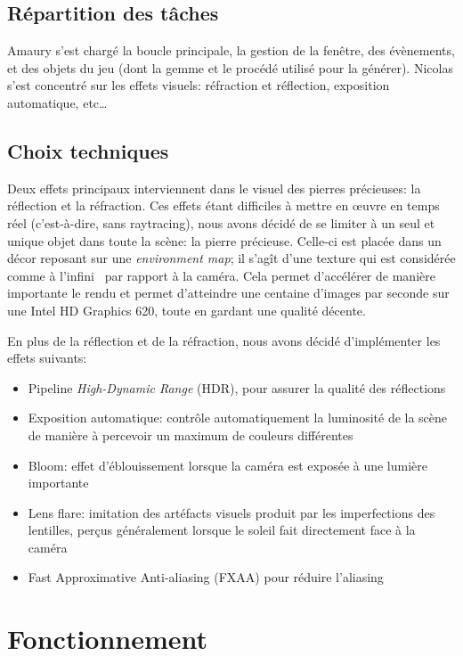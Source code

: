 \documentclass[a4paper,12pt]{article}
\begin{document}
\subsection{Répartition des tâches}
Amaury s'est chargé la boucle principale, la gestion de la fenêtre, des évènements, et des objets du jeu
(dont la gemme et le procédé utilisé pour la générer). Nicolas s'est concentré sur les effets visuels: réfraction et réflection,
exposition automatique, etc\ldots

\subsection{Choix techniques}
Deux effets principaux interviennent dans le visuel des pierres précieuses: la réflection et la réfraction.
Ces effets étant difficiles à mettre en œuvre en temps réel (c'est-à-dire, sans raytracing), nous avons décidé
de se limiter à un seul et unique objet dans toute la scène: la pierre précieuse. Celle-ci est placée dans un
décor reposant sur une \emph{environment map}; il s'agît d'une texture qui est considérée comme \og à l'infini \fg
\ par rapport à la caméra. Cela permet d'accélérer de manière importante le rendu et permet d'atteindre une
centaine d'images par seconde sur une Intel HD Graphics 620, toute en gardant une qualité décente.

En plus de la réflection et de la réfraction, nous avons décidé d'implémenter les effets suivants:
\begin{itemize}
    \item Pipeline \emph{High-Dynamic Range} (HDR), pour assurer la qualité des réflections
    \item Exposition automatique: contrôle automatiquement la luminosité de la scène de manière à percevoir un maximum de couleurs différentes
    \item Bloom: effet d'éblouissement lorsque la caméra est exposée à une lumière importante
    \item Lens flare: imitation des artéfacts visuels produit par les imperfections des lentilles, perçus généralement lorsque le soleil fait directement face à la caméra
    \item Fast Approximative Anti-aliasing (FXAA) pour réduire \og l'aliasing \fg
\end{itemize}

\section{Fonctionnement}
\end{document}
